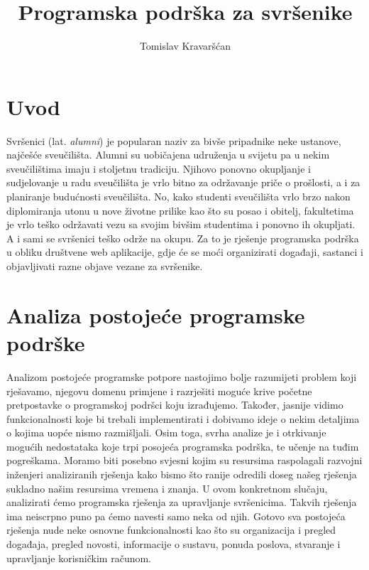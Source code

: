 \documentclass[times, utf8, zavrsni]{fer}
\begin{document}

\title{Programska podrška za svršenike}

\author{Tomislav Kravaršćan}

\maketitle

\izvornik

\zahvala{}

\tableofcontents

\chapter{Uvod}
Svršenici (lat. \textit{alumni}) je popularan naziv za bivše pripadnike neke ustanove, najčešće sveučilišta. Alumni su uobičajena udruženja u svijetu pa u nekim sveučilištima imaju i stoljetnu tradiciju. Njihovo ponovno okupljanje i sudjelovanje u radu sveučilišta je vrlo bitno za održavanje priče o prošlosti, a i za planiranje budućnosti sveučilišta. No, kako studenti sveučilišta vrlo brzo nakon diplomiranja utonu u nove životne prilike kao što su posao i obitelj, fakultetima je vrlo teško održavati vezu sa svojim bivšim studentima i ponovno ih okupljati. A i sami se svršenici teško održe na okupu. Za to je rješenje programska podrška u obliku društvene web aplikacije, gdje će se moći organizirati događaji, sastanci i objavljivati razne objave vezane za svršenike.

\chapter{Analiza postojeće programske podrške}
Analizom postojeće programske potpore nastojimo bolje razumijeti problem koji rješavamo, njegovu domenu primjene i razrješiti moguće krive početne pretpostavke o programskoj podršci koju izrađujemo. Također, jasnije vidimo funkcionalnosti koje bi trebali implementirati i dobivamo ideje o nekim detaljima o kojima uopće nismo razmišljali. Osim toga, svrha analize je i otrkivanje mogućih nedostataka koje trpi posojeća programska podrška, te učenje na tuđim pogreškama. Moramo biti posebno svjesni kojim su resursima raspolagali razvojni inženjeri analiziranih rješenja kako bismo što ranije odredili doseg našeg rješenja sukladno našim resursima vremena i znanja.
U ovom konkretnom slučaju, analizirati ćemo programska rješenja za upravljanje svršenicima. Takvih rješenja ima neiscrpno puno pa ćemo navesti samo neka od njih. Gotovo sva postojeća rješenja nude neke osnovne funkcionalnosti kao što su organizacija i pregled događaja, pregled novosti, informacije o sustavu, ponuda poslova, stvaranje i upravljanje korisničkim računom.
\end{document}
